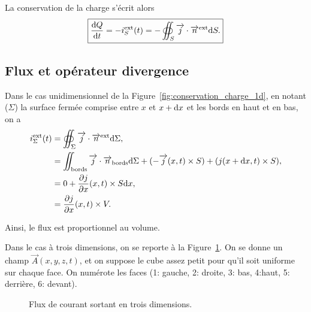         La conservation de la charge s'écrit alors
        \begin{equation}
            \boxed{
                \frac{\mathrm{d} Q}{\mathrm{d} t}=-i_{S}^{\text{ext}}(t)=-\oiint_{S}\protect\overrightarrow{{j}}\cdot\protect\overrightarrow{{n}}^{\text{ext}}\mathrm{d} S.
            }
        \end{equation}

    \subsection{Flux et opérateur \og divergence\fg}

        Dans le cas unidimensionnel de la Figure~\ref{fig:conservation_charge_1d}, en notant ($\Sigma$) la surface fermée comprise entre $x$ et $x+\mathrm{d} x$ et les bords en haut et en bas, on a 
        \begin{align}
            i_{\Sigma}^{\text{ext}}(t)
            &=
            \oiint_{\Sigma}\protect\overrightarrow{{j}}\cdot\protect\overrightarrow{{n}}^{\text{ext}}\mathrm{d}\Sigma,\\
            &=
            \iint_{\text{bords}}\protect\overrightarrow{{j}}\cdot\protect\overrightarrow{{n}}_{\text{bords}}\mathrm{d}\Sigma+(-\protect\overrightarrow{{j}}(x,t)\times S)+(j(x+\mathrm{d} x,t)\times S),\\
            &= 0 +\frac{\partial j}{\partial x}(x,t)\times S\mathrm{d} x,\\
            &=\frac{\partial j}{\partial x}(x,t) \times V.
        \end{align}

        Ainsi, le flux est proportionnel au volume.

        Dans le cas à trois dimensions, on se reporte à la Figure~\ref{fig:flux_operateur_divergence_trois_dimensions}. On se donne un champ $\vec{A}(x,y,z,t)$, et on suppose le cube assez petit pour qu'il soit uniforme sur chaque face. On numérote les faces (1: gauche, 2: droite, 3: bas, 4:haut, 5: derrière, 6: devant).

        \begin{figure}
            \centering
            \caption{Flux de courant sortant en trois dimensions.}    
            \label{fig:flux_operateur_divergence_trois_dimensions}
        \end{figure}

